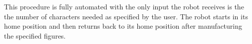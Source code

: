 This procedure is fully automated with the only input the robot receives is the the number of characters needed as specified by the user. The robot starts in its home position and then returns back to its home position after manufacturing the specified figures.



